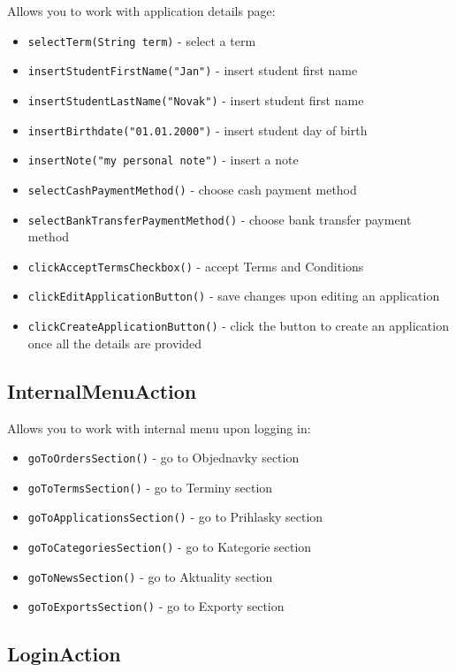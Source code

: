 \documentclass{article}
\let\oldtexttt\texttt
\renewcommand{\texttt}[1]{%
  \colorbox{gray!30}{\oldtexttt{#1}}%
}
\begin{document}
Allows you to work with application details page:
\begin{itemize}
  \item \texttt{selectTerm(String term)} - select a term
  \item \texttt{insertStudentFirstName("Jan")} - insert student first name
  \item \texttt{insertStudentLastName("Novak")} - insert student first name
  \item \texttt{insertBirthdate("01.01.2000")} - insert student day of birth
  \item \texttt{insertNote("my personal note")} - insert a note
  \item \texttt{selectCashPaymentMethod()} - choose cash payment method
  \item \texttt{selectBankTransferPaymentMethod()} - choose bank transfer payment method
  \item \texttt{clickAcceptTermsCheckbox()} - accept Terms and Conditions
  \item \texttt{clickEditApplicationButton()} - save changes upon editing an application
  \item \texttt{clickCreateApplicationButton()} - click the button to create an application once all the details are provided
\end{itemize}

\subsection*{InternalMenuAction}

Allows you to work with internal menu upon logging in:
\begin{itemize}
  \item \texttt{goToOrdersSection()} - go to Objednavky section
  \item \texttt{goToTermsSection()} - go to Terminy section
  \item \texttt{goToApplicationsSection()} - go to Prihlasky section
  \item \texttt{goToCategoriesSection()} - go to Kategorie section
  \item \texttt{goToNewsSection()} - go to Aktuality section
  \item \texttt{goToExportsSection()} - go to Exporty section
\end{itemize}

\subsection*{LoginAction}
\end{document}
